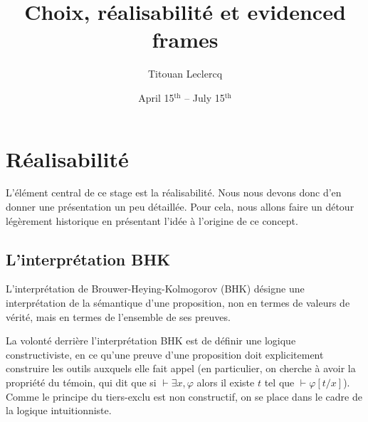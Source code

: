 \documentclass{article}
\title{Choix, réalisabilité et evidenced frames}
\author{Titouan Leclercq}
\date{April 15$^{\mathrm{th}}$ -- July 15$^{\mathrm{th}}$}
\begin{document}
\maketitle

\tableofcontents

\section{Réalisabilité}

L'élément central de ce stage est la réalisabilité. Nous nous devons donc d'en donner une présentation un peu détaillée. Pour cela, nous allons faire un détour légèrement historique en présentant l'idée à l'origine de ce concept.

\subsection{L'interprétation BHK}

L'interprétation de Brouwer-Heying-Kolmogorov (BHK) désigne une interprétation de la sémantique d'une proposition, non en termes de valeurs de vérité, mais en termes de l'ensemble de ses preuves.

La volonté derrière l'interprétation BHK est de définir une logique constructiviste, en ce qu'une preuve d'une proposition doit explicitement construire les outils auxquels elle fait appel (en particulier, on cherche à avoir la propriété du témoin, qui dit que si $\vdash \exists x, \varphi$ alors il existe $t$ tel que $\vdash \varphi[t/x]$). Comme le principe du tiers-exclu est non constructif, on se place dans le cadre de la logique intuitionniste.
\end{document}
